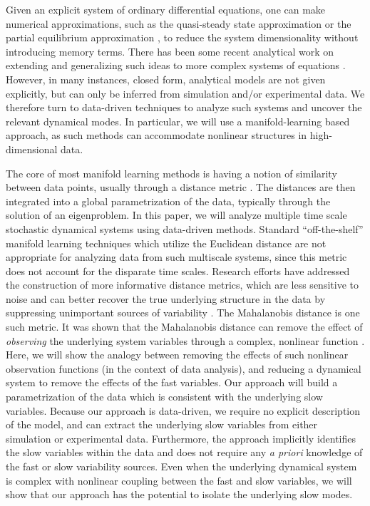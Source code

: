Given an explicit system of ordinary differential equations,
one can make numerical approximations, such as the quasi-steady state approximation \cite{segel1989quasi} or
the partial equilibrium approximation \cite{gallagher1986combined}, to reduce the system dimensionality without introducing memory terms.
%
There has been some recent analytical work on extending and
generalizing such ideas to more complex systems of equations \cite{ait2008closed, calderon2007fitting, contou2011model, dong2007simplification, givon2004extracting, pavliotis2007parameter,  sotiropoulos2009model}.
%
However, in many instances, closed form, analytical models are not given explicitly,
but can only be inferred from simulation and/or experimental data.
%
We therefore turn to data-driven techniques to analyze such systems and uncover the relevant dynamical modes.
%
In particular, we will use a manifold-learning based approach, as such methods can accommodate nonlinear structures in high-dimensional data.

The core of most manifold learning methods is having a notion of similarity between data points,
usually through a distance metric \cite{Belkin2003, Coifman2006, coifman2005geometric, roweis2000nonlinear, tenenbaum2000global}.
%
The distances are then integrated into a global parametrization of the data, typically through the solution of an eigenproblem.
%
In this paper, we will analyze multiple time scale stochastic dynamical systems using data-driven methods.
%
Standard ``off-the-shelf'' manifold learning techniques which utilize the Euclidean distance are not appropriate
for analyzing data from such multiscale systems, since this metric does not account for the disparate time scales.
%
Research efforts have addressed the construction of more informative distance metrics, which are less sensitive to noise
and can better recover the true underlying structure in the data by suppressing unimportant sources of variability \cite{berry2013time, gepshtein2013image, rubner2000earth, simonyan2013fisher, xing2002distance}.
%
The Mahalanobis distance is one such metric.
%
It was shown that the Mahalanobis distance can remove the effect of {\em observing}
the underlying system variables through a complex, nonlinear function \cite{dsilva2013nonlinear, singer2008non, talmon2013empirical}.
%
Here, we will show the analogy between removing the effects of such nonlinear observation functions (in the context of data analysis), and reducing a dynamical system to remove the effects of the fast variables.
%
Our approach will build a parametrization of the data which is consistent with the underlying slow variables.
%
Because our approach is data-driven, we require no explicit description of the model, and can extract the underlying slow variables
from either simulation or experimental data.
%
Furthermore, the approach implicitly identifies the slow variables within the data and
does not require any {\em a priori} knowledge of the fast or slow variability sources.
%
Even when the underlying dynamical system is complex with nonlinear coupling between the fast and slow variables, we will show that our approach has the potential to isolate the underlying slow modes.

